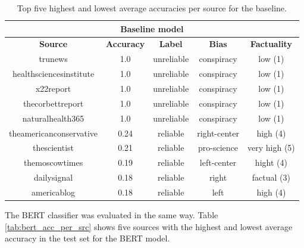 \begin{table}[H]
    \centering
\begin{tabular}{|c|c|c|c|c|}
\multicolumn{5}{c}{\cellcolor[HTML]{FFCCC9}\textbf{Baseline model}} \\ \hline
\textbf{Source}         & \textbf{Accuracy} & \textbf{Label} & \textbf{Bias} & \textbf{Factuality} \\ \hline
trunews                 & 1.0               & unreliable     & conspiracy    & low (1)             \\ \hline
healthsciencesinstitute & 1.0               & unreliable     & conspiracy    & low (1)             \\ \hline
x22report               & 1.0               & unreliable     & conspiracy    & low (1)             \\ \hline
thecorbettreport        & 1.0               & unreliable     & conspiracy    & low (1)             \\ \hline
naturalhealth365        & 1.0               & unreliable     & conspiracy    & low (1)             \\ \hline \hline
theamericanconservative & 0.24              & reliable       & right-center  & high (4)            \\ \hline
thescientist            & 0.21              & reliable       & pro-science   & very high (5)       \\ \hline
themoscowtimes          & 0.19              & reliable       & left-center   & hight (4)           \\ \hline
dailysignal             & 0.18              & reliable       & right         & factual (3)         \\ \hline
americablog             & 0.18              & reliable       & left          & high (4)            \\ \hline
\end{tabular}
    \caption{Top five highest and lowest average accuracies per source for the baseline.}
    \label{tab:acc_per_src}
\end{table}

The BERT classifier was evaluated in the same way. Table \ref{tab:bert_acc_per_src} shows five sources with the highest and lowest average accuracy in the test set for the BERT model. 

